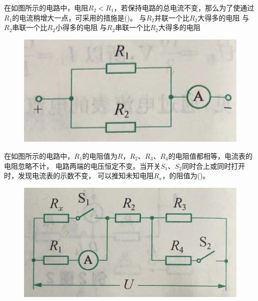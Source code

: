 \documentclass[a4paper,cs4size]{BHCexam}
\begin{document}
\begin{groups}
\begin{questions}[]
        \question[5]在如图所示的电路中，电阻$R_2<R_1$，若保持电路的总电流不变，那么为了使通过$R_1$的电流稍增大一点，可采用的措施是(\quad\quad\quad)。
        {与$R_2$并联一个比$R_2$大得多的电阻}
        {与$R_2$串联一个比$R_2$小得多的电阻}
        {与$R_2$串联一个比$R_2$大得多的电阻}
        \begin{figure}[htb]
            \flushright
            \includegraphics [scale=0.45,trim=0 0 0 0]{./image/physics_circuit2_3.png}
            \label{fig:fig_circuit2_3}
        \end{figure}
        \vspace{2.5cm}


        \question[5]在如图所示的电路中，$R_1$的电阻值为$R$，$R_2$、$R_3$、$R_4$的电阻值都相等，电流表的电阻忽略不计，
        电路两端的电压恒定不变。当开关$S_1$、$S_2$同时合上或同时打开时，发现电流表的示数不变， 可以推知未知电阻$R_x$，的阻值为(\quad\quad\quad)。
        \begin{figure}[htb]
            \flushright
            \includegraphics [scale=0.4,trim=0 0 0 0]{./image/physics_circuit2_4.png}
            \label{fig:fig_circuit2_4}
        \end{figure}
        \vspace{2.5cm}


\end{questions}
\end{groups}
\end{document}
